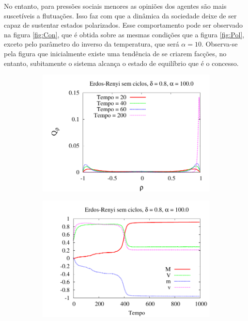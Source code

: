 No entanto, para pressões sociais menores as opiniões dos agentes são mais
suscetíveis a flutuações. Isso faz com que a dinâmica da sociedade deixe
de ser capaz de sustentar estados polarizados. Esse comportamento pode ser
observado na figura \ref{fig:Con}, que é obtida sobre as mesmas condições
que a figura \ref{fig:Pol}, exceto pelo parâmetro do inverso da temperatura,
que será $\alpha = 10$. Observa-se pela figura que inicialmente existe uma
tendência de se criarem facções, no entanto, subitamente o sistema
alcança o estado de equilíbrio que é o concesso.

\begin{figure}
\centering
\begin{subfigure}[]{0.75\textwidth}
    \centering
    \includegraphics[width = \textwidth]{Figures/Histograma_Arvore}
    \caption{}
\end{subfigure}
\begin{subfigure}[]{0.75\textwidth}
   \centering 
    \includegraphics[width = \textwidth]{Figures/MagTempo_Arvore}

\end{subfigure}
\end{figure}
